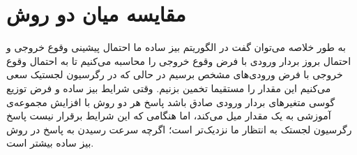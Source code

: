 \documentclass{article}
\begin{document}
\section{مقایسه میان دو روش}
به طور خلاصه می‌توان گفت در الگوریتم بیز ساده ما احتمال پیشینی وقوع خروجی و احتمال بروز بردار ورودی با فرض وقوع خروجی را محاسبه می‌کنیم تا به احتمال وقوع خروجی با فرض ورودی‌های مشخص برسیم در حالی که در رگرسیون لجستیک سعی می‌کنیم این مقدار را مستقیما تخمین بزنیم. وقتی شرایط بیز ساده و فرض توزیع گوسی متغیرهای بردار ورودی صادق باشد پاسخ هر دو روش با افزایش مجموعه‌ی آموزشی به یک مقدار میل می‌کند، اما هنگامی که این شرایط برقرار نیست پاسخ رگرسیون لجستک به انتظار ما نزدیک‌تر است؛ اگرچه سرعت رسیدن به پاسخ در روش بیز ساده بیشتر است. 
\end{document}

